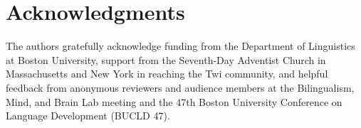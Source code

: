 \documentclass[output=paper,colorlinks,citecolor=brown]{langscibook}
\begin{document}
\section*{Acknowledgments}
The authors gratefully acknowledge funding from the Department of Linguistics at Boston University, support from the Seventh-Day Adventist Church in Massachusetts and New York in reaching the Twi community, and helpful feedback from anonymous reviewers and audience members at the Bilingualism, Mind, and Brain Lab meeting and the 47th Boston University Conference on Language Development (BUCLD 47). 

\printbibliography[heading=subbibliography,notkeyword=this]
\end{document}
